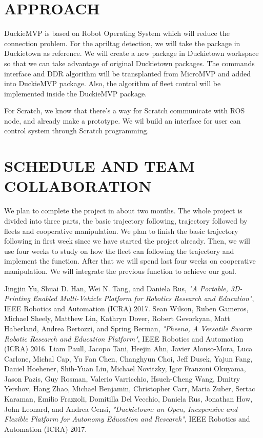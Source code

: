 \documentclass[letterpaper, 10 pt, conference]{ieeeconf}  %
\begin{document}
\section{APPROACH}

DuckieMVP is based on Robot Operating System which will reduce the connection problem. For the apriltag detection, we will take the package in Duckietown as reference. We will create a new package in Duckietown workspace so that we can take advantage of original Duckietown packages. The commands interface and DDR algorithm will be transplanted from MicroMVP and added into DuckieMVP package. Also, the algorithm of fleet control will be implemented inside the DuckieMVP package. 

For Scratch, we know that there's a way for Scratch communicate with ROS node, and already make a prototype. We wil build an interface for user can control system through Scratch programming.

\section{SCHEDULE AND TEAM COLLABORATION}

We plan to complete the project in about two months. The whole project is divided into three parts, the basic trajectory following, trajectory followed by fleets and cooperative manipulation. We plan to finish the basic trajectory following in first week since we have started the project already. Then, we will use four weeks to study on how the fleet can following the trajectory and implement the function. After that we will spend last four weeks on cooperative manipulation. We will integrate the previous function to achieve our goal.

\begin{thebibliography}{1}

Jingjin Yu, Shuai D. Han, Wei N. Tang, and Daniela Rus, \emph{"A Portable, 3D-Printing Enabled Multi-Vehicle
Platform for Robotics Research and Education"}, IEEE Robotics and Automation (ICRA) 2017.
Sean Wilson, Ruben Gameros, Michael Sheely, Matthew Lin, Kathryn Dover, Robert Gevorkyan, Matt Haberland, Andrea Bertozzi, and Spring Berman, \emph{"Pheeno, A Versatile Swarm Robotic Research and Education Platform"}, IEEE Robotics and Automation (ICRA) 2016.
Liam Paull, Jacopo Tani, Heejin Ahn, Javier Alonso-Mora, Luca Carlone, Michal Cap, Yu Fan Chen,
Changhyun Choi, Jeff Dusek, Yajun Fang, Daniel Hoehener, Shih-Yuan Liu, Michael Novitzky, Igor Franzoni
Okuyama, Jason Pazis, Guy Rosman, Valerio Varricchio, Hsueh-Cheng Wang, Dmitry Yershov, Hang Zhao,
Michael Benjamin, Christopher Carr, Maria Zuber, Sertac Karaman, Emilio Frazzoli, Domitilla Del Vecchio,
Daniela Rus, Jonathan How, John Leonard, and Andrea Censi, \emph{"Duckietown: an Open, Inexpensive and Flexible
Platform for Autonomy Education and Research"}, IEEE Robotics and Automation (ICRA) 2017.

\end{thebibliography}
\end{document}
